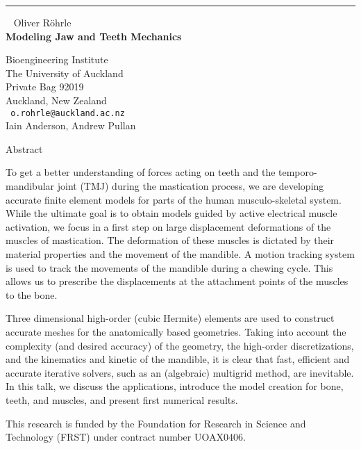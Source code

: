 \documentclass{report}
\begin{document}
\begin{center}

\rule{6in}{1pt} \
{\large
Oliver R\"{o}hrle
\\ {\bf
Modeling Jaw and Teeth Mechanics
}}

Bioengineering Institute \\
The University of Auckland \\
Private Bag 92019 \\
Auckland, New Zealand
\\ {\tt
o.rohrle@auckland.ac.nz
}
\\

Iain Anderson,
Andrew Pullan
\end{center}


Abstract

To get a better understanding of forces acting on teeth and the
temporo-mandibular joint (TMJ) during the mastication process, we are
developing accurate finite element models for parts of the human
musculo-skeletal system. While the ultimate goal is to obtain models
guided by active electrical muscle activation, we focus in a first step
on large displacement deformations of the muscles of mastication. The
deformation of these muscles is dictated by their material properties
and the movement of the mandible. A motion tracking system is used to
track the movements of the mandible during a chewing cycle. This allows
us to prescribe the displacements at the attachment points of the
muscles to the bone.

Three dimensional high-order (cubic Hermite) elements are used to
construct accurate meshes for the anatomically based geometries. Taking
into account the complexity (and desired accuracy) of the geometry, the
high-order discretizations, and the kinematics and kinetic of the
mandible, it is clear that fast, efficient and accurate iterative
solvers, such as an (algebraic) multigrid method, are inevitable. In
this talk, we discuss the applications, introduce the model creation
for bone, teeth, and muscles, and present first numerical results.

This research is funded by the Foundation for Research in Science and
Technology (FRST) under contract number UOAX0406. 
\end{document}
